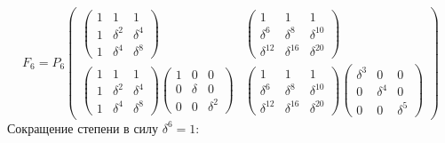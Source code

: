 \[
    F_6
    = P_6
    \begin{pmatrix}
        \begin{pmatrix}
            1 & 1        & 1        \\
            1 & \delta^2 & \delta^4 \\
            1 & \delta^4 & \delta^8
        \end{pmatrix}
         &
        \begin{pmatrix}
            1           & 1           & 1           \\
            \delta^6    & \delta^8    & \delta^{10} \\
            \delta^{12} & \delta^{16} & \delta^{20}
        \end{pmatrix}
        \\
        \begin{pmatrix}
            1 & 1        & 1        \\
            1 & \delta^2 & \delta^4 \\
            1 & \delta^4 & \delta^8
        \end{pmatrix}
        \begin{pmatrix}
            1 & 0      & 0        \\
            0 & \delta & 0        \\
            0 & 0      & \delta^2
        \end{pmatrix}
         &
        \begin{pmatrix}
            1           & 1           & 1           \\
            \delta^6    & \delta^8    & \delta^{10} \\
            \delta^{12} & \delta^{16} & \delta^{20}
        \end{pmatrix}
        \begin{pmatrix}
            \delta^3 & 0        & 0        \\
            0        & \delta^4 & 0        \\
            0        & 0        & \delta^5
        \end{pmatrix}
    \end{pmatrix}
\]
Сокращение степени в силу $\delta^6 = 1$:
